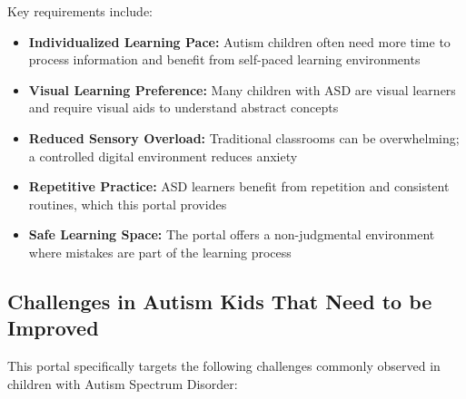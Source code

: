 \documentclass[12pt,a4paper]{article}
\begin{document}
Key requirements include:
\begin{itemize}[leftmargin=*]
    \item \textbf{Individualized Learning Pace:} Autism children often need more time to process information and benefit from self-paced learning environments
    \item \textbf{Visual Learning Preference:} Many children with ASD are visual learners and require visual aids to understand abstract concepts
    \item \textbf{Reduced Sensory Overload:} Traditional classrooms can be overwhelming; a controlled digital environment reduces anxiety
    \item \textbf{Repetitive Practice:} ASD learners benefit from repetition and consistent routines, which this portal provides
    \item \textbf{Safe Learning Space:} The portal offers a non-judgmental environment where mistakes are part of the learning process
\end{itemize}

\subsection{Challenges in Autism Kids That Need to be Improved}

This portal specifically targets the following challenges commonly observed in children with Autism Spectrum Disorder:
\end{document}
